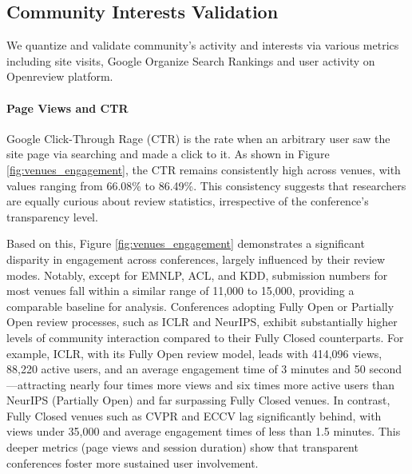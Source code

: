 \subsection{Community Interests Validation}
\label{subsec:community_interests}

We quantize and validate community's activity and interests via various metrics including site visits, Google Organize Search Rankings and user activity on Openreview platform.

\paragraph{Page Views and CTR}
Google Click-Through Rage (CTR) is the rate when an arbitrary user saw the site page via searching and made a click to it. As shown in Figure \ref{fig:venues_engagement}, the CTR remains consistently high across venues, with values ranging from 66.08\% to 86.49\%. This consistency suggests that researchers are equally curious about review statistics, irrespective of the conference's transparency level.


Based on this, Figure \ref{fig:venues_engagement} demonstrates a significant disparity in engagement across conferences, largely influenced by their review modes. Notably, except for EMNLP, ACL, and KDD, submission numbers for most venues fall within a similar range of 11,000 to 15,000, providing a comparable baseline for analysis. Conferences adopting Fully Open or Partially Open review processes, such as ICLR and NeurIPS, exhibit substantially higher levels of community interaction compared to their Fully Closed counterparts. For example, ICLR, with its Fully Open review model, leads with 414,096 views, 88,220 active users, and an average engagement time of 3 minutes and 50 second—attracting nearly four times more views and six times more active users than NeurIPS (Partially Open) and far surpassing Fully Closed venues. In contrast, Fully Closed venues such as CVPR and ECCV lag significantly behind, with views under 35,000 and average engagement times of less than 1.5 minutes. This deeper metrics (page views and session duration) show that transparent conferences foster more sustained user involvement. 


